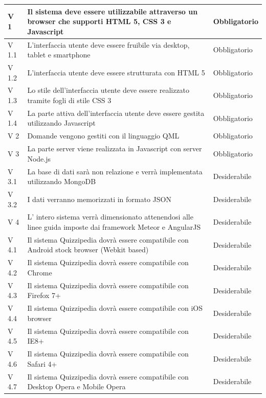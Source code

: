 \documentclass[a4paper,11pt]{article}
\begin{document}
\begin{longtable}{p{}p{}p{}}
V 1 & Il sistema deve essere utilizzabile attraverso un browser che supporti HTML 5, CSS 3 e Javascript & Obbligatorio\\
\midrule
V 1.1 & L'interfaccia utente deve essere fruibile via desktop, tablet e smartphone & Obbligatorio\\
\midrule
V 1.2 & L'interfaccia utente deve essere strutturata con HTML 5 & Obbligatorio\\
\midrule
V 1.3 & Lo stile dell'interfaccia utente deve essere realizzato tramite fogli di stile CSS 3 & Obbligatorio\\
\midrule
V 1.4 & La parte attiva dell'interfaccia utente deve essere gestita utilizzando Javascript & Obbligatorio\\
\midrule
V 2 & Domande vengono gestiti con il linguaggio QML & Obbligatorio\\
\midrule
V 3 & La parte server viene realizzata in Javascript con server Node.js & Obbligatorio\\
\midrule
V 3.1 & La base di dati sarà non relazione e verrà implementata utilizzando MongoDB & Desiderabile\\
\midrule
V 3.2 & I dati verranno memorizzati in formato JSON & Desiderabile\\
\midrule
V 4 & L' intero sistema verrà dimensionato attenendosi alle linee guida imposte dai framework Meteor e AngularJS & Desiderabile\\
\midrule
V 4.1 & Il sistema Quizzipedia dovrà essere compatibile con Android stock browser (Webkit based) & Desiderabile\\
\midrule
V 4.2 & Il sistema Quizzipedia dovrà essere compatibile con Chrome & Desiderabile\\
\midrule
V 4.3 & Il sistema Quizzipedia dovrà essere compatibile con Firefox 7+ & Desiderabile\\
\midrule
V 4.4 & Il sistema Quizzipedia dovrà essere compatibile con iOS browser & Desiderabile\\
\midrule
V 4.5 & Il sistema Quizzipedia dovrà essere compatibile con IE8+ & Desiderabile\\
\midrule
V 4.6 & Il sistema Quizzipedia dovrà essere compatibile con Safari 4+ & Desiderabile\\
\midrule
V 4.7 & Il sistema Quizzipedia dovrà essere compatibile con Desktop Opera e Mobile Opera & Desiderabile\\
			
			\end{longtable}
	
	\newpage
\end{document}
